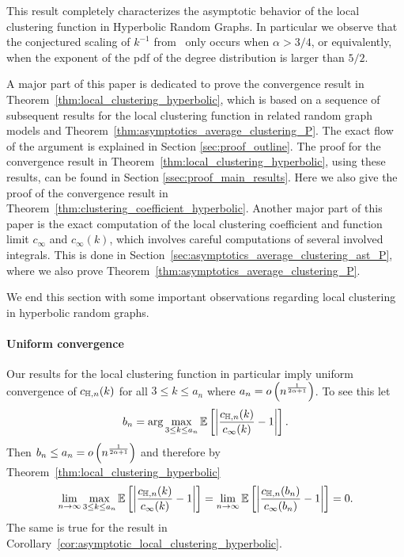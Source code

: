 This result completely characterizes the asymptotic behavior of the local clustering function in Hyperbolic Random Graphs. In particular we observe that the conjectured scaling of $k^{-1}$ from~\cite{krioukov2010hyperbolic} only occurs when $\alpha > 3/4$, or equivalently, when the exponent of the pdf of the degree distribution is larger than $5/2$. 

A major part of this paper is dedicated to prove the convergence result in Theorem~\ref{thm:local_clustering_hyperbolic}, which is based on a sequence of subsequent results for the local clustering function in related random graph models and Theorem~\ref{thm:asymptotics_average_clustering_P}. The exact flow of the argument is explained in Section \ref{sec:proof_outline}. The proof for the convergence result in Theorem~\ref{thm:local_clustering_hyperbolic}, using these results, can be found in Section \ref{ssec:proof_main_results}. Here we also give the proof of the convergence result in Theorem~\ref{thm:clustering_coefficient_hyperbolic}. Another major part of this paper is the exact computation of the local clustering coefficient and function limit $c_\infty$ and $c_\infty(k)$, which involves careful computations of several involved integrals. This is done in Section~\ref{sec:asymptotics_average_clustering_ast_P}, where we also prove Theorem~\ref{thm:asymptotics_average_clustering_P}.

We end this section with some important observations regarding local clustering in hyperbolic random graphs.



 

\paragraph{Uniform convergence}

Our results for the local clustering function in particular imply uniform convergence of $c_{\mathbb{H},n}(k)$ for all $3 \le k \le a_n$ where $a_n = o\left(n^{\frac{1}{2\alpha + 1}}\right)$. To see this let
\[
	b_n = \arg \max_{3 \le k \le a_n} \mathbb{E}\left[\left|\frac{c_{\mathbb{H} ,n}(k)}{c_\infty(k)} - 1\right|\right].
\]
Then $b_n \le a_n = o\left(n^{\frac{1}{2\alpha + 1}}\right)$ and therefore by Theorem~\ref{thm:local_clustering_hyperbolic}
\[
	\lim_{n \to \infty} \max_{3 \le k \le a_n} \mathbb{E}\left[\left|\frac{c_{\mathbb{H} ,n}(k)}{c_\infty(k)} - 1\right|\right] 
	= \lim_{n \to \infty}\mathbb{E}\left[\left|\frac{c_{\mathbb{H} ,n}(b_n)}{c_\infty(b_n)} - 1\right|\right] = 0.
\]
The same is true for the result in Corollary~\ref{cor:asymptotic_local_clustering_hyperbolic}.

